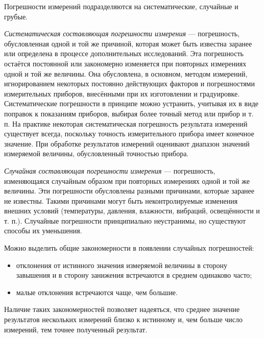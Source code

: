 \documentclass[a4paper, 12pt]{extarticle}
\begin{document}
Погрешности измерений подразделяются на систематические, случайные и грубые.

\emph{Систематическая составляющая погрешности измерения} --- погрешность, обусловленная одной и той же причиной, которая может быть известна заранее или определена в процессе дополнительных исследований. Эта погрешность остаётся постоянной или закономерно изменяется при повторных измерениях одной и той же величины. Она обусловлена, в основном, методом измерений, игнорированием %
некоторых постоянно действующих факторов и погрешностями измерительных приборов, внесёнными при их изготовлении и градуировке. Систематические погрешности в принципе можно устранить, учитывая их в виде поправок к показаниям приборов, выбирая более точный метод или прибор и т. п. На практике некоторая систематическая погрешность результата измерений существует всегда, поскольку точность измерительного прибора имеет конечное значение. При обработке результатов измерений оценивают диапазон значений измеряемой величины, обусловленный точностью прибора.

\emph{Случайная составляющая погрешности измерения} ---  погрешность, изменяющаяся случайным образом при повторных измерениях одной и той же величины. Эти погрешности обусловлены разными причинами, которые заранее не известны. Такими причинами могут быть неконтролируемые изменения внешних условий (температуры, давления, влажности, вибраций, освещённости и т. п.). Случайные погрешности принципиально неустранимы, но существуют способы их уменьшения.

Можно выделить общие закономерности в появлении случайных погрешностей:
\begin{itemize}
  \item отклонения от истинного значения измеряемой величины в
сторону завышения и в сторону занижения встречаются в среднем
одинаково часто;
  \item малые отклонения встречаются чаще, чем большие.
\end{itemize}

Наличие таких закономерностей позволяет надеяться, что среднее значение результатов нескольких измерений близко к истинному и, чем больше число измерений, тем точнее полученный результат.
\end{document}

